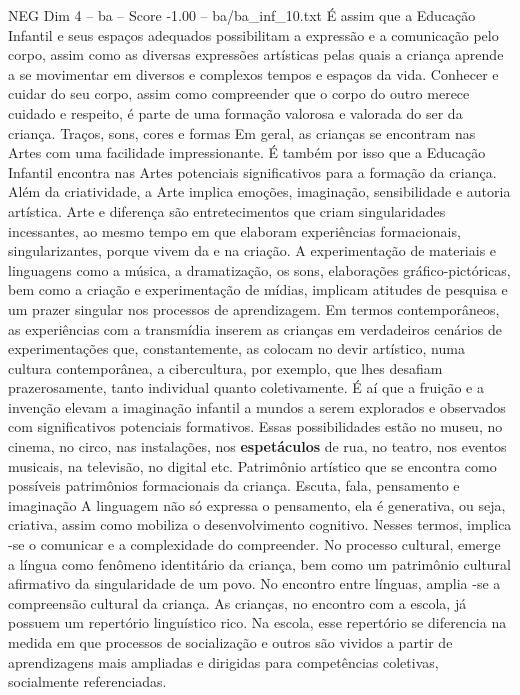 \begin{textsample}{NEG Dim 4 – ba – Score -1.00 – ba/ba\_inf\_10.txt}
É assim que a Educação Infantil e seus espaços adequados possibilitam a expressão e a comunicação pelo corpo, assim como as diversas expressões artísticas pelas quais a criança aprende a se movimentar em diversos e complexos tempos e espaços da vida.
Conhecer e cuidar do seu corpo, assim como compreender que o corpo do outro merece cuidado e respeito, é parte de uma formação valorosa e valorada do ser da criança.
Traços, sons, cores e formas Em geral, as crianças se encontram nas Artes com uma facilidade impressionante.
É também por isso que a Educação Infantil encontra nas Artes potenciais significativos para a formação da criança.
Além da criatividade, a Arte implica emoções, imaginação, sensibilidade e autoria artística.
Arte e diferença são entretecimentos que criam singularidades incessantes, ao mesmo tempo em que elaboram experiências formacionais, singularizantes, porque vivem da e na criação.
A experimentação de materiais e linguagens como a música, a dramatização, os sons, elaborações gráfico-pictóricas, bem como a criação e experimentação de mídias, implicam atitudes de pesquisa e um prazer singular nos processos de aprendizagem.
Em termos contemporâneos, as experiências com a transmídia inserem as crianças em verdadeiros cenários de experimentações que, constantemente, as colocam no devir artístico, numa cultura contemporânea, a cibercultura, por exemplo, que lhes desafiam prazerosamente, tanto individual quanto coletivamente.
É aí que a fruição e a invenção elevam a imaginação infantil a mundos a serem explorados e observados com significativos potenciais formativos.
Essas possibilidades estão no museu, no cinema, no circo, nas instalações, nos \textbf{espetáculos} de rua, no teatro, nos eventos musicais, na televisão, no digital etc.
Patrimônio artístico que se encontra como possíveis patrimônios formacionais da criança.
Escuta, fala, pensamento e imaginação A linguagem não só expressa o pensamento, ela é generativa, ou seja, criativa, assim como mobiliza o desenvolvimento cognitivo.
Nesses termos, implica -se o comunicar e a complexidade do compreender.
No processo cultural, emerge a língua como fenômeno identitário da criança, bem como um patrimônio cultural afirmativo da singularidade de um povo.
No encontro entre línguas, amplia -se a compreensão cultural da criança.
As crianças, no encontro com a escola, já possuem um repertório linguístico rico.
Na escola, esse repertório se diferencia na medida em que processos de socialização e outros são vividos a partir de aprendizagens mais ampliadas e dirigidas para competências coletivas, socialmente referenciadas.

\end{textsample}
